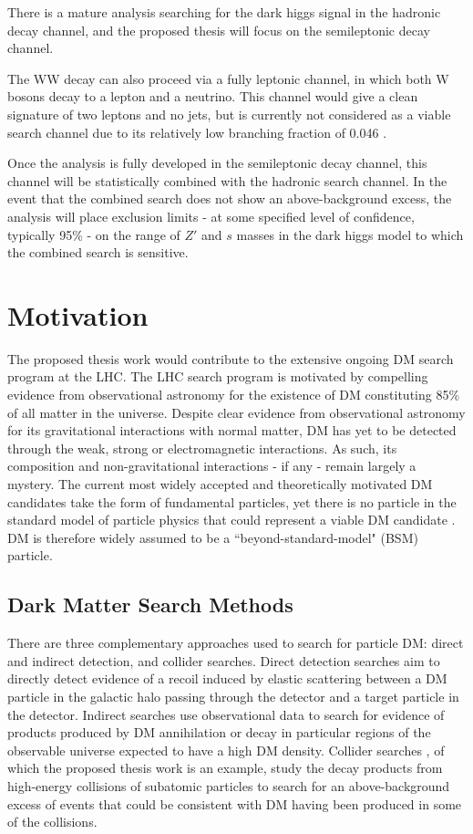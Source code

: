 \documentclass[12pt]{article}
\begin{document}
There is a mature analysis searching for the dark higgs signal in the hadronic decay channel, and the proposed thesis will focus on the semileptonic decay channel. 

The WW decay can also proceed via a fully leptonic channel, in which both W bosons decay to a lepton and a neutrino. This channel would give a clean signature of two leptons and no jets, but is currently not considered as a viable search channel due to its relatively low branching fraction of 0.046 \cite{PDG}.

Once the analysis is fully developed in the semileptonic decay channel, this channel will be statistically combined with the hadronic search channel. In the event that the combined search does not show an above-background excess, the analysis will place exclusion limits - at some specified level of confidence, typically 95\% - on the range of $Z'$ and $s$ masses in the dark higgs model to which the combined search is sensitive.

\section{Motivation}

The proposed thesis work would contribute to the extensive ongoing DM search program at the LHC. The LHC search program is motivated by compelling evidence from observational astronomy for the existence of DM constituting 85\% \cite{planck} of all matter in the universe. Despite clear evidence from observational astronomy for its gravitational interactions with normal matter, DM has yet to be detected through the weak, strong or electromagnetic interactions. As such, its composition and non-gravitational interactions - if any - remain largely a mystery. The current most widely accepted and theoretically motivated DM candidates take the form of fundamental particles, yet there is no particle in the standard model of particle physics that could represent a viable DM candidate \cite{feng}. DM is therefore widely assumed to be a ``beyond-standard-model" (BSM) particle. 

\subsection{Dark Matter Search Methods}
There are three complementary approaches used to search for particle DM: direct and indirect detection, and collider searches. Direct detection searches \cite{Schumann_2019, 2015gya} aim to directly detect evidence of a recoil induced by elastic scattering between a DM particle in the galactic halo passing through the detector and a target particle in the detector. Indirect searches \cite{CIRELLI_2012, conrad} use observational data to search for evidence of products produced by DM annihilation or decay in particular regions of the observable universe expected to have a high DM density. Collider searches \cite{DM_colliders}, of which the proposed thesis work is an example, study the decay products from high-energy collisions of subatomic particles to search for an above-background excess of events that could be consistent with DM having been produced in some of the collisions.
\end{document}
